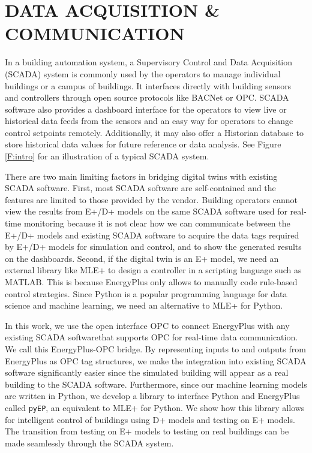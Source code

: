 \section{DATA ACQUISITION \& COMMUNICATION}

In a building automation system, a Supervisory Control and Data Acquisition (SCADA) system is commonly used by the operators to manage individual buildings or a campus of buildings. 
It interfaces directly with building sensors and controllers through open source protocols like BACNet or OPC. 
SCADA software also provides a dashboard interface for the operators to view live or historical data feeds from the sensors and an easy way for operators to change control setpoints remotely. 
Additionally, it may also offer a Historian database to store historical data values for future reference or data analysis.
See Figure \ref{F:intro} for an illustration of a typical SCADA system.

There are two main limiting factors in bridging digital twins with existing SCADA software.
First, most SCADA software are self-contained and the features are limited to those provided by the vendor.
Building operators cannot view the results from E+/D+ models on the same SCADA software used for real-time monitoring because it is not clear how we can communicate between the E+/D+ models and existing SCADA software to acquire the data tags required by E+/D+ models for simulation and control, and to show the generated results on the dashboards.
Second, if the digital twin is an E+ model, we need an external library like MLE+ \cite{bernaletal12mti} to design a controller in a scripting language such as MATLAB.
This is because EnergyPlus only allows to manually code rule-based control strategies.
Since Python is a popular programming language for data science and machine learning, we need an alternative to MLE+ for Python. 

In this work, we use the open interface OPC to connect EnergyPlus with any existing SCADA softwarethat supports OPC for real-time data communication. 
We call this EnergyPlus-OPC bridge.
By representing inputs to and outputs from EnergyPlus as OPC tag structures, we make the integration into existing SCADA software significantly easier since the simulated building will appear as a real building to the SCADA software.
Furthermore, since our machine learning models are written in Python, we develop a library to interface Python and EnergyPlus called \texttt{pyEP}, an equivalent to MLE+ for Python.
We show how this library allows for intelligent control of buildings using D+ models and testing on E+ models.
The transition from testing on E+ models to testing on real buildings can be made seamlessly through the SCADA system.

